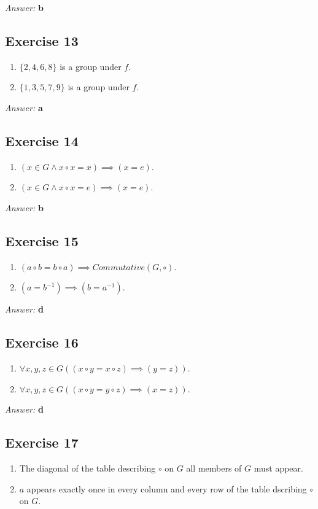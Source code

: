 \documentclass[11pt]{article}
\begin{document}
\emph{Answer:} \textbf{b}
\subsection{Exercise 13}
\label{sec-2-13}
\begin{enumerate}
\item $\{2, 4, 6, 8\}$ is a group under $f$.
\item $\{1, 3, 5, 7, 9\}$ is a group under $f$.
\end{enumerate}

\emph{Answer:} \textbf{a}
\subsection{Exercise 14}
\label{sec-2-14}
\begin{enumerate}
\item $(x \in G \land x \circ x = x) \implies (x = e)$.
\item $(x \in G \land x \circ x = e) \implies (x = e)$.
\end{enumerate}

\emph{Answer:} \textbf{b}
\subsection{Exercise 15}
\label{sec-2-15}
\begin{enumerate}
\item $(a \circ b = b \circ a) \implies Commutative(G, \circ)$.
\item $(a = b^{-1}) \implies (b = a^{-1})$.
\end{enumerate}

\emph{Answer:} \textbf{d}
\subsection{Exercise 16}
\label{sec-2-16}
\begin{enumerate}
\item $\forall x, y, z \in G ((x \circ y = x \circ z) \implies (y = z))$.
\item $\forall x, y, z \in G ((x \circ y = y \circ z) \implies (x = z))$.
\end{enumerate}

\emph{Answer:} \textbf{d}
\subsection{Exercise 17}
\label{sec-2-17}
\begin{enumerate}
\item The diagonal of the table describing $\circ$ on $G$ all members of $G$ 
must appear.
\item $a$ appears exactly once in every column and every row of the table 
dscribing $\circ$ on $G$.
\end{enumerate}
\end{document}
